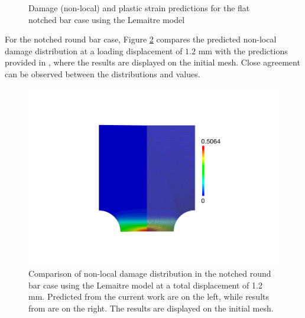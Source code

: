 \documentclass[sn-mathphys,Numbered]{sn-jnl}%
\begin{document}
\begin{figure}[htb]
	\centering
	\caption{Damage (non-local) and plastic strain predictions for the flat notched bar case using the Lemaitre model}
	\label{fig:lemaitre_point_values_flat}
\end{figure}

For the notched round bar case, Figure \ref{fig:lemaitre_damage_field} compares the predicted non-local damage distribution at a loading displacement of $1.2$ mm with the predictions provided in \citet{cesar_de_sa_damage_2006}, where the results are displayed on the initial mesh.
Close agreement can be observed between the distributions and values.
\begin{figure}[htbp]
	\centering
		\includegraphics[height=0.4\textwidth]{./Figures/LemaitreCompare/axi_lemaitre_compare}
		\caption{Comparison of non-local damage distribution in the notched round bar case using the Lemaitre model at a total displacement of 1.2 mm. Predicted from the current work are on the left, while results from \citet{cesar_de_sa_damage_2006} are on the right. The results are displayed on the initial mesh.}
	\label{fig:lemaitre_damage_field}
\end{figure}
\end{document}
